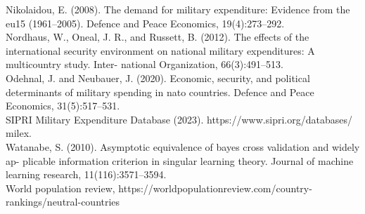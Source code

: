 \documentclass[12pt,a4paper]{article}
\begin{document}
Nikolaidou, E. (2008). The demand for military expenditure: Evidence from the eu15 (1961–2005). Defence and Peace Economics, 19(4):273–292. \\

Nordhaus, W., Oneal, J. R., and Russett, B. (2012). The effects of the international security environment on national military expenditures: A multicountry study. Inter- national Organization, 66(3):491–513. \\

Odehnal, J. and Neubauer, J. (2020). Economic, security, and political determinants of military spending in nato countries. Defence and Peace Economics, 31(5):517–531. \\

SIPRI Military Expenditure Database (2023). https://www.sipri.org/databases/ milex. \\

Watanabe, S. (2010). Asymptotic equivalence of bayes cross validation and widely ap- plicable information criterion in singular learning theory. Journal of machine learning research, 11(116):3571–3594. \\

World population review, https://worldpopulationreview.com/country-rankings/neutral-countries \\
\end{document}
